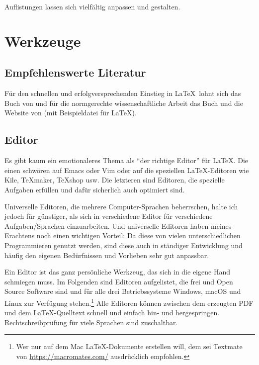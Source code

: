 \documentclass[12pt,	%
				headings=small,		%
				toc=bibliography,	%
			]	%
{scrreprt}		%
\begin{document}
			Auflistungen lassen sich vielfältig anpassen und gestalten.\autocite{schlosser}

\chapter{Werkzeuge}
\label{cha:werkzeuge}
\section{Empfehlenswerte Literatur}
	\label{sec:literaturempfehlung}
	Für den schnellen und erfolgversprechenden Einstieg in \LaTeX\ lohnt sich das Buch von \textcite{schlosser} und für die normgerechte wissenschaftliche Arbeit das Buch und die Website von \textcite{scholz}(mit Beispieldatei für \LaTeX\autocite{scholz:latexvorlage}).
\section{Editor}
\label{sec:editor}
	Es gibt kaum ein emotionaleres Thema als \enquote{der richtige Editor} für \LaTeX. Die einen schwören auf \textsf{Emacs} oder \textsf{Vim} oder auf die speziellen \LaTeX-Editoren wie \textsf{Kile}, \textsf{\TeX{}maker}, \textsf{\TeX{}shop} usw. 
	Die letzteren sind Editoren, die spezielle Aufgaben erfüllen und dafür sicherlich auch optimiert sind. 
	
	Universelle Editoren, die mehrere Computer-Sprachen beherrschen, halte ich jedoch für günstiger, als sich in verschiedene Editor für verschiedene Aufgaben/Sprachen einzuarbeiten. Und universelle Editoren haben meines Erachtens noch einen wichtigen Vorteil: Da diese von vielen unterschiedlichen Programmieren genutzt werden, sind diese auch in ständiger Entwicklung und häufig den eigenen Bedürfnissen und Vorlieben sehr gut anpassbar.

	Ein Editor ist das ganz persönliche Werkzeug, das sich in die eigene Hand schmiegen muss.  Im Folgenden sind Editoren aufgelistet, die frei und Open Source Software sind und für alle drei Betriebssysteme Windows, macOS und Linux zur Verfügung stehen.\footnote{Wer nur auf dem Mac \LaTeX-Dokumente erstellen will, dem sei Textmate von \href{https://macromates.com/}{https://macromates.com/} ausdrücklich empfohlen.} Alle Editoren können zwischen dem erzeugten PDF und dem \LaTeX-Quelltext schnell und einfach hin- und hergespringen. Rechtschreibprüfung für viele Sprachen sind zuschaltbar.
\end{document}
